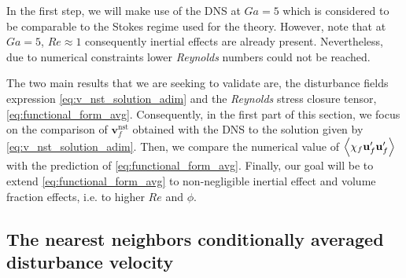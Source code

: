 In the first step, we will make use of the DNS at $Ga = 5$ which is considered to be comparable to the Stokes regime used for the theory. 
However, note that at $Ga = 5$, $Re \approx 1$ consequently inertial effects are already present. 
Nevertheless, due to numerical constraints lower \textit{Reynolds} numbers could not be reached. 

The two main results that we are seeking to validate are, the disturbance fields expression \eqref{eq:v_nst_solution_adim} and the \textit{Reynolds} stress closure tensor, \eqref{eq:functional_form_avg}. 
Consequently, in the first part of this section, we focus on the comparison of $\textbf{v}_f^\text{nst}$ obtained with the DNS to the solution given by \ref{eq:v_nst_solution_adim}.
Then, we compare the numerical value of $\left<\chi_f \textbf{u}_f'\textbf{u}_f'\right>$ with the prediction of \ref{eq:functional_form_avg}. 
Finally, our goal will be to extend \ref{eq:functional_form_avg} to non-negligible inertial effect and volume fraction effects, i.e. to higher $Re$ and $\phi$. 

\subsection{The nearest neighbors conditionally averaged disturbance velocity}

